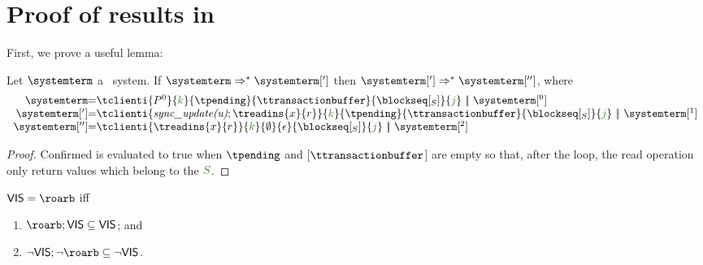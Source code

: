 
\section{Proof of results in }


First, we prove a useful lemma: 

\begin{lemma}\label{lemma:empty_queue} 

Let $\systemterm$ a \gsp\ system. If $\systemterm\Arro^*\systemterm[']$ then $\systemterm[']\Arro^*\systemterm['']$, where
\[\begin{array}{r@{=}l}
					\systemterm &  \tclienti{\tprogram^0}{\tknown}{\tpending}{\ttransactionbuffer}{\tsent}{\treceivebuffer} \ \bigpar \ \systemterm[^0]
					\\
					\systemterm['] & \tclienti{\tsyncupd{u};\treadins{x}{r}}{\tknown}{\tpending}{\ttransactionbuffer}{\tsent}{\treceivebuffer}  \ \bigpar \   \systemterm[^1]	\\
										\systemterm[''] & \tclienti{\treadins{x}{r}}{\tknown}{\emptyset}{\epsilon}{\tsent}{\treceivebuffer} \ \bigpar \   \systemterm[^2]	

				  \end{array}
				\]				


\end{lemma}

\begin{proof} Confirmed is evaluated to true when $\tpending$ and [$\ttransactionbuffer$] are empty so that, after the loop, the read operation only return values which belong to the $\queuemessage$.
\end{proof}	

\begin{lemma} $\ovis = \roarb$ iff 

\begin{enumerate}
   \item $\roarb;\ovis \subseteq \ovis$; and
   \item $\neg\ovis;\neg\roarb \subseteq \neg\ovis$.
\end{enumerate}
\end{lemma}

